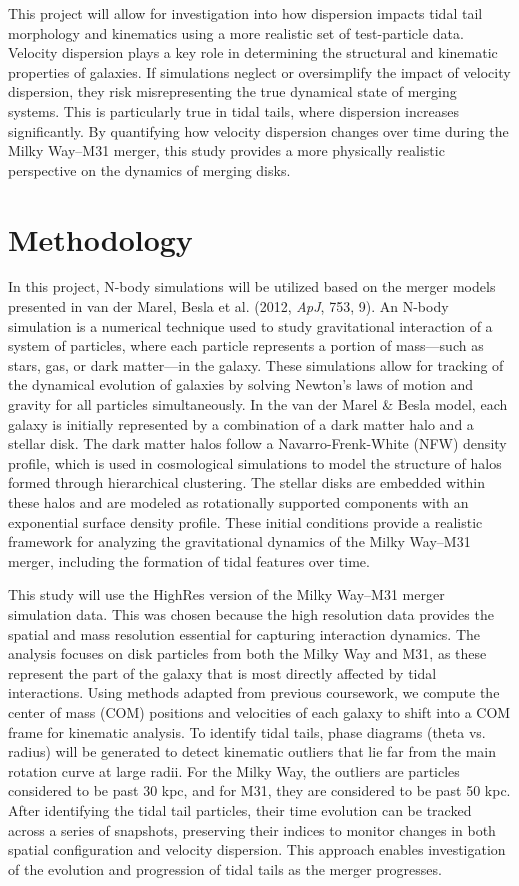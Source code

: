 \documentclass[fleqn,usenatbib]{mnras}
\begin{document}
This project will allow for investigation into how dispersion impacts tidal tail morphology and kinematics using a more realistic set of test-particle data.  Velocity dispersion plays a key role in determining the structural and kinematic properties of galaxies. If simulations neglect or oversimplify the impact of velocity dispersion, they risk misrepresenting the true dynamical state of merging systems. This is particularly true in tidal tails, where dispersion increases significantly. By quantifying how velocity dispersion changes over time during the Milky Way–M31 merger, this study provides a more physically realistic perspective on the dynamics of merging disks. 


\section{Methodology}

In this project, N-body simulations will be utilized based on the merger models presented in van der Marel, Besla et al. (2012, \textit{ApJ}, 753, 9). An N-body simulation is a numerical technique used to study gravitational interaction of a system of particles, where each particle represents a portion of mass—such as stars, gas, or dark matter—in the galaxy. These simulations allow for tracking of the dynamical evolution of galaxies by solving Newton’s laws of motion and gravity for all particles simultaneously. In the van der Marel \& Besla model, each galaxy is initially represented by a combination of a dark matter halo and a stellar disk. The dark matter halos follow a Navarro-Frenk-White (NFW) density profile, which is used in cosmological simulations to model the structure of halos formed through hierarchical clustering. The stellar disks are embedded within these halos and are modeled as rotationally supported components with an exponential surface density profile. These initial conditions provide a realistic framework for analyzing the gravitational dynamics of the Milky Way–M31 merger, including the formation of tidal features over time.

This study will use the HighRes version of the Milky Way–M31 merger simulation data. This was chosen because the high resolution data provides the spatial and mass resolution essential for capturing interaction dynamics. The analysis focuses on disk particles from both the Milky Way and M31, as these represent the part of the galaxy that is most directly affected by tidal interactions. Using methods adapted from previous coursework, we compute the center of mass (COM) positions and velocities of each galaxy to shift into a COM frame for kinematic analysis. To identify tidal tails, phase diagrams  (theta vs. radius) will be generated to detect kinematic outliers that lie far from the main rotation curve at large radii. For the Milky Way, the outliers are particles considered to be past 30 kpc, and for M31, they are considered to be past 50 kpc. After identifying the tidal tail particles,  their time evolution can be tracked across a series of snapshots, preserving their indices to monitor changes in both spatial configuration and velocity dispersion. This approach enables investigation of the evolution and progression of tidal tails as the merger progresses.
\end{document}
